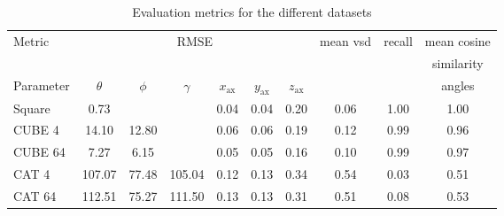 \documentclass[10pt,a4paper]{article}
\begin{document}
\begin{table}
    \begin{adjustbox}{width=\textwidth}
        \begin{tabular}[width = \textwidth]{lccccccccc} 
    Metric & \multicolumn{6}{c}{RMSE} & mean vsd & recall & mean cosine \\
           &&&&&&&&& similarity \\
    \hline
    Parameter & $\theta$ & $\phi$ & $\gamma$ & $x_{\text{ax}}$  &
    $y_{\text{ax}}$ & $z_{\text{ax}}$ &       &      & angles\\
\hline
Square        & 0.73     &        &          & 0.04             & 0.04            & 0.20            & 0.06  & 1.00 & 1.00 \\
CUBE 4        & 14.10    & 12.80  &          & 0.06             & 0.06
              & 0.19     & 0.12   & 0.99     & 0.96            \\
CUBE 64       & 7.27    & 6.15  &          & 0.05             & 0.05
              & 0.16     & 0.10   & 0.99     & 0.97            \\
CAT 4         & 107.07   & 77.48  & 105.04   & 0.12             & 0.13
              & 0.34     & 0.54 & 0.03 & 0.51    \\
CAT 64        & 112.51   & 75.27  & 111.50   & 0.13             & 0.13
              & 0.31     & 0.51 & 0.08 & 0.53    \\
\end{tabular}
\end{adjustbox}
\caption{Evaluation metrics for the different datasets}
\label{square_results}
\end{table}
\end{document}
